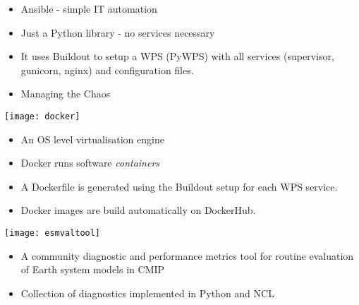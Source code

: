 \documentclass[portrait,a0paper,fontscale=0.4]{baposter} %
\newcommand{\compresslist}{%
\setlength{\itemsep}{1pt}%
\setlength{\parskip}{0pt}%
\setlength{\parsep}{0pt}%
}
\begin{document}
\begin{poster}
{\begin{minipage}{0.85\textwidth}
      \begin{itemize}\compresslist
        \item Ansible - simple IT automation
        \item Just a Python library - no services necessary
        \item It uses Buildout to setup a WPS (PyWPS) with all services (supervisor, gunicorn, nginx) and configuration files.
        \item Managing the Chaos
      \end{itemize}
    \end{minipage}
    \begin{minipage}{0.15\textwidth}
      \texttt{[image: docker]}
    \end{minipage}
    \begin{minipage}{0.85\textwidth}
      \begin{itemize}\compresslist
        \item An OS level virtualisation engine
        \item Docker runs software \textit{containers}
        \item A Dockerfile is generated using the Buildout setup for each WPS service.
        \item Docker images are build automatically on DockerHub.
      \end{itemize}
    \end{minipage}
    \begin{minipage}{0.15\textwidth}
      \texttt{[image: esmvaltool]}
    \end{minipage}
    \begin{minipage}{0.85\textwidth}
      \begin{itemize}\compresslist
        \item A community diagnostic and performance metrics tool for routine evaluation of Earth system models in CMIP
        \item Collection of diagnostics implemented in Python and NCL
      \end{itemize}
    \end{minipage}
}




\end{poster}
\end{document}

